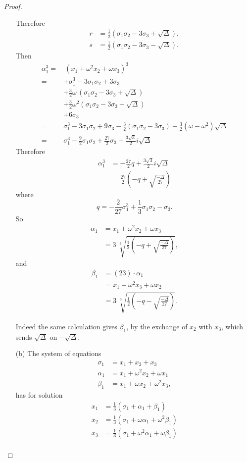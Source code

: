\documentclass[11pt,a4paper]{article}
\begin{document}
\begin{proof}
\begin{enumerate}
Therefore
\begin{align*}
r &= \frac{1}{2}(\sigma_1 \sigma_2 - 3 \sigma_3 +\sqrt{\Delta}),\\
s &= \frac{1}{2}(\sigma_1 \sigma_2 - 3 \sigma_3 -\sqrt{\Delta}).
\end{align*}
Then 
\begin{align*}
\alpha_1^3 =&\ ( x_1+\omega^2 x_2+\omega x_3)^3\\
=&+\sigma_1^3-3\sigma_1\sigma_2+3\sigma_3\\
&+\frac{3}{2}\omega\,( \sigma_1 \sigma_2 - 3 \sigma_3 +\sqrt{\Delta})\\
&+\frac{3}{2}\omega^2(\sigma_1 \sigma_2 - 3 \sigma_3 -\sqrt{\Delta})\\
&+6\sigma_3\\
=& \sigma_1^3-3\sigma_1\sigma_2+9\sigma_3 -\frac{3}{2}(\sigma_1 \sigma_2 - 3\sigma_3)+\frac{3}{2}(\omega - \omega^2)\sqrt{\Delta}\\
=&\sigma_1^3 -\frac{9}{2} \sigma_1 \sigma_2 +\frac{27}{2} \sigma_3 +\frac{3\sqrt{3}}{2} i \sqrt{\Delta}
\end{align*}
Therefore
\begin{align*}
\alpha_1^3 &= -\frac{27}{2} q  + \frac{3\sqrt{3}}{2} i \sqrt{\Delta}\\
&=\frac{27}{2} \left ( - q +\sqrt{\frac{-\Delta}{27} }\right )
\end{align*}
where
$$q = -\frac{2}{27} \sigma_1^3 +\frac{1}{3} \sigma_1 \sigma_2 - \sigma_3.$$
So
\begin{align*}
\alpha_1 &= x_1+\omega^2 x_2 + \omega x_3\\
&= 3\  \sqrt[3]{\frac{1}{2}\left ( -q +\sqrt{\frac{-\Delta}{27} }\right)},
\end{align*}
and
\begin{align*}
\beta_1 &= (2 3)\cdot \alpha_1\\
&= x_1+\omega^2 x_3 + \omega x_2\\
&= 3\  \sqrt[3]{\frac{1}{2}\left ( -q - \sqrt{\frac{-\Delta}{27} }\right)}.
\end{align*}

Indeed the same calculation gives $\beta_1$, by the exchange of $x_2$ with $x_3$, which sends $\sqrt{\Delta}$ on $- \sqrt{\Delta}$.

\item[(b)]
The system of equations
\begin{align*}
\sigma_1 &= x_1 + x_2 +x_3\\
\alpha_1 &= x_1+\omega^2 x_2+\omega x_1\\
\beta_1 &= x_1+\omega x_2+\omega^2 x_3,
\end{align*}
has for solution
\begin{align*}
x_1 &= \frac{1}{3} (\sigma_1 + \alpha_1+\beta_1)\\
x_2 &= \frac{1}{3} (\sigma_1 + \omega \alpha_1+ \omega^2\beta_1)\\
x_3 &= \frac{1}{3} (\sigma_1 + \omega^2 \alpha_1+ \omega \beta_1)\\
\end{align*}


\end{enumerate}
\end{proof}
\end{document}
